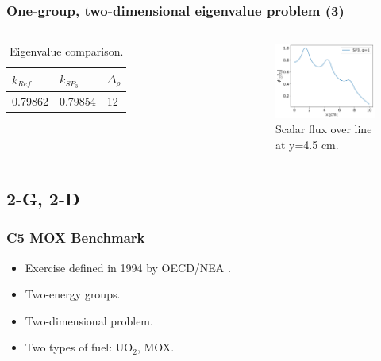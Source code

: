 \begin{frame}
\frametitle{One-group, two-dimensional eigenvalue problem (3)}

\begin{columns}
    \column[t]{4cm}
    \begin{table}[htbp!]
      \centering
      \caption{Eigenvalue comparison.}
      \begin{tabular}{lll}
      \toprule
        $k_{Ref}$ & $k_{SP_3}$  & $\Delta_{\rho}$ \\
      \midrule
        0.79862   & 0.79854     & 12        \\
      \bottomrule
      \end{tabular}
    \end{table}

    \column[t]{6cm}
    \begin{figure}[htbp!]
        \begin{center}
            \includegraphics[width=6cm]{figures/flux-output}
        \end{center}
        \caption{Scalar flux over line at y=4.5 cm.}
    \end{figure}
\end{columns}
\end{frame}


\subsection{2-G, 2-D}

\begin{frame}
\frametitle{C5 MOX Benchmark}

    \begin{itemize}
        \item Exercise defined in 1994 by OECD/NEA \cite{cavarec_benchmark_1994}.
        \item Two-energy groups.
        \item Two-dimensional problem.
        \item Two types of fuel: UO$_2$, MOX.
    \end{itemize}
\end{frame}


